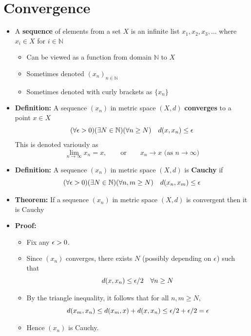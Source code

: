 \documentclass[11pt,twoside]{report}
\newcommand{\bbN}{{\mathbb{N}}}
\begin{document}
\section{Convergence} 
\begin{itemize}
\item  A \textbf{sequence} of elements from a set $X$  is an infinite list $x_1, x_2, x_3, \dots$ where $x_i \in X$ for $i \in \bbN$ 
\begin{itemize}

\item Can be viewed as a function from domain $\bbN$ to  $X$ 

\item Sometimes denoted $(x_n )_{ n \in \bbN}$%

\item Sometimes denoted with curly brackets as $\{x_n\}$
\end{itemize}


\item \textbf{Definition:}  A sequence $(x_n)$  in metric space  $(X,d)$  \textbf{converges} to a point $x \in X$%
\[
( \forall \eps > 0) (\exists N \in \bbN) (\forall n \ge N) \quad   d(x,x_n) \le \eps
\]
This is denoted variously as 
\[
\lim_{n\to \infty} x_n = x , \qquad \text{or} \qquad x_n \to x  \text{  (as $n \to \infty$)}%
\]

\item \textbf{Definition:} 
A sequence $(x_n)$ in metric space  $(X,d)$ is \textbf{Cauchy} if
\[
( \forall \eps > 0) (\exists N \in \bbN) (\forall n,m \ge N) \quad   d(x_n,x_m) \le \eps
\]


\item \textbf{Theorem:} If a sequence  $(x_n)$ in metric space $(X, d)$  is convergent then it is Cauchy 

\item \textbf{Proof:} 
\begin{itemize}
\item Fix any $\epsilon > 0$. 
\item Since $(x_n)$ converges, there exists $N$ (possibly depending on $\epsilon$) such that 
\[
d(x,x_n) \le \epsilon/2 \quad \forall n  \ge N
\]
\item By the triangle inequality, it follows that for all $n,m \ge N$, 
\[
d(x_m, x_n ) \le d(x_m, x) + d(x, x_n) \le  \epsilon/2 + \epsilon/2  = \epsilon 
\]
\item Hence $(x_n)$ is Cauchy. 
\end{itemize}



\end{itemize}
\end{document}
